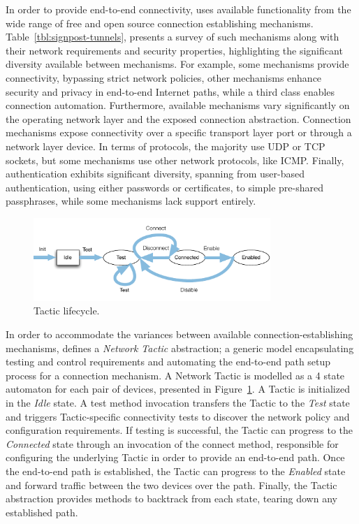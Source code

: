 In order to provide end-to-end connectivity, \signpost uses available
functionality from the wide range of free and open source connection
establishing mechanisms. Table~\ref{tbl:signpost-tunnels}, presents a survey of
such mechanisms along with their network requirements and security properties,
highlighting the significant diversity available between mechanisms.  For example,
some mechanisms provide connectivity, bypassing strict network policies,  other
mechanisms enhance security and privacy in end-to-end Internet paths, while a
third class enables connection automation.  Furthermore, available mechanisms
vary significantly on the operating network layer and the exposed connection
abstraction. Connection mechanisms expose connectivity over a specific transport
layer port or through a network layer device.  In terms of protocols, the
majority use UDP or TCP sockets, but some mechanisms use other network
protocols, like ICMP\@.  Finally, authentication exhibits significant diversity,
spanning from user-based authentication, using either passwords or certificates,
to simple pre-shared passphrases, while some mechanisms lack support entirely. 

\begin{figure}
  \begin{center}
	\includegraphics[width=0.8\textwidth]{Chapter3/Chapter3Figs/signpost-tactic}
  \end{center}
  \caption{\signpost Tactic lifecycle.}
  \label{fig:signpost-tactic}
\end{figure}

In order to accommodate the variances between available connection-establishing
mechanisms, \signpost defines a \textit{Network Tactic} abstraction; a generic
model encapsulating testing and control requirements and automating the
end-to-end path setup process for a connection mechanism.  A Network Tactic is
modelled as a 4 state automaton for each pair of devices, presented in
Figure~\ref{fig:signpost-tactic}.  A Tactic is initialized in the \emph{Idle}
state.  A test method invocation transfers the Tactic to the \emph{Test} state
and triggers Tactic-specific connectivity tests to discover the network policy
and configuration requirements.  If testing is successful, the Tactic can
progress to the \emph{Connected} state through an invocation of the connect
method, responsible for configuring the underlying Tactic in order to provide an end-to-end
path. Once the end-to-end path is established, the Tactic can progress to the
\emph{Enabled} state and forward traffic between the two devices over the path.
Finally, the Tactic abstraction provides methods to backtrack from each state,
tearing down any established path. 

